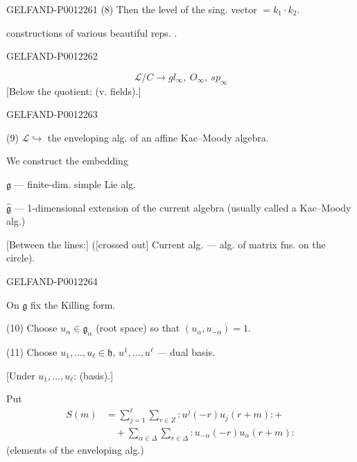 \begin{GelfandAdjacentEvidence}{GELFAND-P001226}{1}
(8) Then the level of the sing. vector \(=k_1\cdot k_2\).

 constructions of various beautiful reps. .
\end{GelfandAdjacentEvidence}
\begin{GelfandAdjacentEvidence}{GELFAND-P001226}{2}


\begin{equation*}
\mathcal L/C\longrightarrow gl_\infty,\ O_\infty,\ sp_\infty
\end{equation*}
[Below the quotient: (v. fields).]
\end{GelfandAdjacentEvidence}
\begin{GelfandAdjacentEvidence}{GELFAND-P001226}{3}



(9) \(\mathcal L\hookrightarrow\) the enveloping alg. of an affine Kac--Moody algebra.

We construct the embedding

\(\mathfrak g\) --- finite-dim. simple Lie alg.

\(\widehat{\mathfrak g}\) --- 1-dimensional extension of the current algebra (usually called a Kac--Moody alg.)

[Between the lines:] ([crossed out]  Current alg. --- alg. of matrix fns. on the circle).
\end{GelfandAdjacentEvidence}
\begin{GelfandAdjacentEvidence}{GELFAND-P001226}{4}


On \(\mathfrak g\) fix the Killing form.

(10) Choose \(u_\alpha\in\mathfrak g_\alpha\) (root space) so that
\((u_\alpha,u_{-\alpha})=1\).

(11) Choose \(u_1,\ldots,u_\ell\in\mathfrak h\), \(u^1,\ldots,u^\ell\) --- dual basis.

[Under \(u_1,\ldots,u_\ell\): (basis).]

Put
\begin{equation*}
\begin{aligned}
S(m)&=\sum_{j=1}^{\ell}\sum_{r\in Z}:u^j(-r)u_j(r+m):+\\
&\quad+\sum_{\alpha\in\Delta}\sum_{r\in\Delta}:u_{-\alpha}(-r)u_\alpha(r+m):
\end{aligned}\tag{12}
\end{equation*}
(elements of the enveloping alg.)
\end{GelfandAdjacentEvidence}


